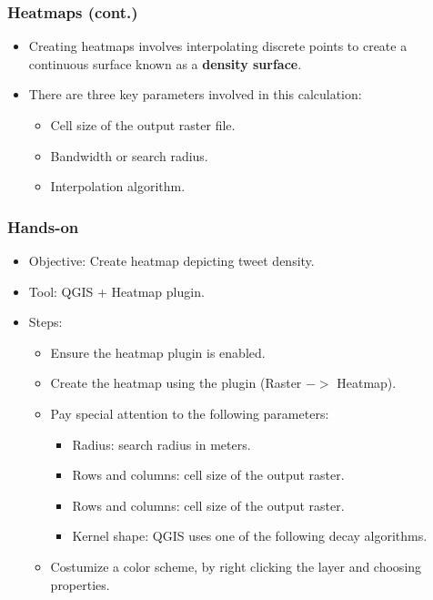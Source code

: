 \documentclass[hyperref={pdfpagelabels=true}]{beamer}
\begin{document}
\begin{frame}
\frametitle{Heatmaps (cont.)}

\begin{itemize}
      \item<1->Creating heatmaps involves interpolating discrete points to create a continuous surface known as a \textbf{density surface}. 
      \item<2->There are three key parameters involved in this calculation:
  \begin{itemize}
	\item<3->Cell size of the output raster file.%
	\item<3->Bandwidth or search radius.%
	\item<3->Interpolation algorithm.%
	
  \end{itemize}
\end{itemize}
\end{frame}


\begin{frame}
\frametitle{Hands-on}
\begin{itemize}
  \item<1->Objective: Create heatmap depicting tweet density.
  \item<1->Tool: QGIS + Heatmap plugin.
  \item<1->Steps:  
  \begin{itemize}
    \item<2->Ensure the heatmap plugin is enabled.  
    \item<2->Create the heatmap using the plugin (Raster $->$ Heatmap).
    \item<2->Pay special attention to the following parameters:    
    \begin{itemize}
      \item<3->Radius: search radius in meters.
      \item<3->Rows and columns: cell size of the output raster.
      \item<3->Rows and columns: cell size of the output raster.
      \item<3->Kernel shape: QGIS uses one of the following decay algorithms.      
    \end{itemize}        
    \item<4->Costumize a color scheme, by right clicking the layer and choosing properties.
  \end{itemize}    
\end{itemize}  
\end{frame}
\end{document}
